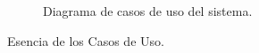 \begin{figure}[htbp]
	\begin{center}
		\caption{Diagrama de casos de uso del sistema.}
		\label{fig:casosDeUso}
	\end{center}
\end{figure}

Esencia de los Casos de Uso.




